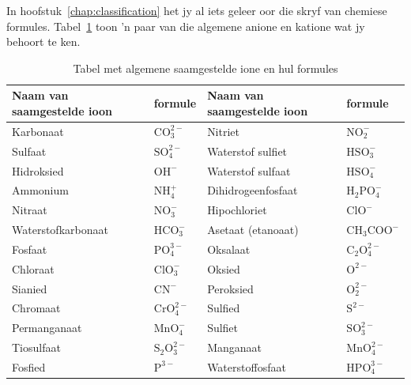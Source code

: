 In hoofstuk~\ref{chap:classification} het jy al iets geleer oor die skryf van chemiese formules. Tabel~\ref{tab:ions} toon  'n paar van die algemene anione en katione wat jy behoort te ken.
          \begin{table}[H]
        \begin{center}
      \label{m38689*uid99}
    \noindent
      \begin{tabular}{|l|l|l|l|}\hline
                  \textbf{Naam van saamgestelde ioon} &
                  \textbf{formule} &  \textbf{Naam van saamgestelde ioon} & \textbf{formule} \\ \hline
        Karbonaat & $\mathrm{CO}_{3}^{2-}$ & Nitriet & $\mathrm{NO}_{2}^{-}$ \\ \hline
        Sulfaat &  $\mathrm{SO}_{4}^{2-}$ & Waterstof sulfiet & $\mathrm{HSO}_{3}^{-}$ \\ \hline
        Hidroksied & ${\mathrm{OH}}^{-}$ & Waterstof sulfaat & $\mathrm{HSO}_{4}^{-}$ \\ \hline
        Ammonium & $\mathrm{NH}_{4}^{+}$ & Dihidrogeenfosfaat & ${\mathrm{H}}_{2}\mathrm{PO}_{4}^{-}$ \\ \hline
        Nitraat & $\mathrm{NO}_{3}^{-}$ & Hipochloriet & ${\mathrm{ClO}}^{-}$ \\ \hline
        Waterstofkarbonaat & $\mathrm{HCO}_{3}^{-}$ & Asetaat (etanoaat)  & ${\mathrm{CH}}_{3}{\mathrm{COO}}^{-}$ \\ \hline
        Fosfaat & $\mathrm{PO}_{4}^{3-}$ & Oksalaat & ${\mathrm{C}}_{2}\mathrm{O}_{4}^{2-}$ \\ \hline
        Chloraat & $\mathrm{ClO}_{3}^{-}$ &  Oksied & ${\mathrm{O}}^{2-}$ \\ \hline
        Sianied & ${\mathrm{CN}}^{-}$ & Peroksied & $\mathrm{O}_{2}^{2-}$ \\ \hline
        Chromaat & $\mathrm{CrO}_{4}^{2-}$ & Sulfied & ${\mathrm{S}}^{2-}$ \\ \hline
        Permanganaat & $\mathrm{MnO}_{4}^{-}$ & Sulfiet & $\mathrm{SO}_{3}^{2-}$ \\ \hline
        Tiosulfaat & ${\mathrm{S}}_{2}\mathrm{O}_{3}^{2-}$ & Manganaat & $\mathrm{MnO}_{4}^{2-}$ \\ \hline
        Fosfied & ${\mathrm{P}}^{3-}$ & Waterstoffosfaat & $\mathrm{HPO}_{4}^{3-}$ \\ \hline
    \end{tabular}
      \end{center}
    \caption{Tabel met algemene saamgestelde ione en hul formules}
\label{tab:ions}
\end{table}
    \par
	\par


